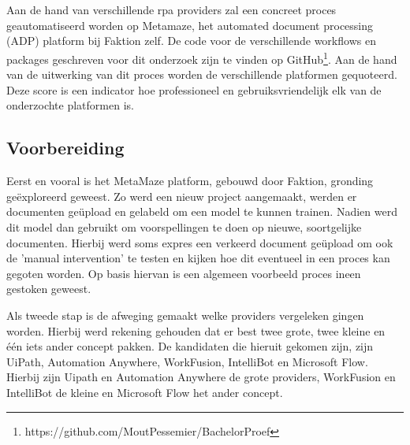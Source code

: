 
\chapter{}
\label{ch:methodologie}


Aan de hand van verschillende \acrshort{rpa} providers zal een concreet proces geautomatiseerd worden op Metamaze, het automated document processing (ADP) platform bij Faktion zelf. De code voor de verschillende workflows en packages geschreven voor dit onderzoek zijn te vinden op GitHub\footnote{https://github.com/MoutPessemier/BachelorProef}. Aan de hand van de uitwerking van dit proces worden de verschillende platformen gequoteerd. Deze score is een indicator hoe professioneel en gebruiksvriendelijk elk van de onderzochte platformen is.


\section{Voorbereiding}
Eerst en vooral is het MetaMaze platform, gebouwd door Faktion, gronding geëxploreerd geweest. Zo werd een nieuw project aangemaakt, werden er documenten geüpload en gelabeld om een model te kunnen trainen. Nadien werd dit model dan gebruikt om voorspellingen te doen op nieuwe, soortgelijke documenten. Hierbij werd soms expres een verkeerd document geüpload om ook de 'manual intervention' te testen en kijken hoe dit eventueel in een proces kan gegoten worden. Op basis hiervan is een algemeen voorbeeld proces ineen gestoken geweest.

Als tweede stap is de afweging gemaakt welke providers vergeleken gingen worden. Hierbij werd rekening gehouden dat er best twee grote, twee kleine en één iets ander concept pakken. De kandidaten die hieruit gekomen zijn, zijn UiPath, Automation Anywhere, WorkFusion, IntelliBot en Microsoft Flow. Hierbij zijn Uipath en Automation Anywhere de grote providers, WorkFusion en IntelliBot de kleine en Microsoft Flow het ander concept.

